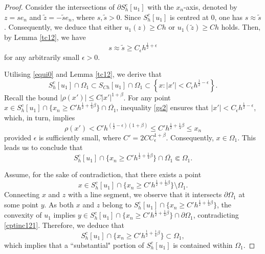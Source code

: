 \documentclass[11pt]{amsart}
\theoremstyle{plain}
\newcommand{\0}{\textbf{0}}
\numberwithin{equation}{section}
\numberwithin{equation}{section}
\numberwithin{figure}{section}
\begin{document}
\begin{proof}
Consider the intersections of $\partial S_h^c[u_1]$ with the $x_n$-axis, denoted by $z = se_n$ and $\tilde{z} = -\tilde{s}e_n$, where $s, \tilde{s} > 0$. Since $S_h^c[u_1]$ is centred at $0$, one has $s\approx \tilde{s}$. Consequently, we deduce that either $u_1(z) \geq Ch$ or $u_1(\tilde{z}) \geq Ch$ holds. 
Then, by Lemma \ref{tc12}, we have
\begin{equation}\label{gs1}
s \approx \tilde{s} \geq C_\epsilon h^{\frac{1}{2} + \epsilon}
\end{equation}
for any arbitrarily small $\epsilon > 0$.

Utilising \eqref{equi0} and Lemma \ref{tc12}, we derive that
\begin{equation}\label{gs2}
S^c_h[u_1] \cap \Omega_1 \subset S_{Ch}[u_1] \cap \Omega_1 \subset \left\{x : |x'| < C_\epsilon h^{\frac{1}{2} - \epsilon} \right\}.
\end{equation}
Recall the bound $|\rho(x')| \leq C|x'|^{1+\beta}$. For any point $x\in S_h^c[u_1] \cap \{x_n \geq C'h^{\frac{1}{2} + \frac{1}{4}\beta}\} \cap \overline{\Omega_1}$, inequality \eqref{gs2} ensures that $|x'| < C_\epsilon h^{\frac{1}{2} - \epsilon}$, which, in turn, implies 
	$$\rho(x') < C' h^{(\frac{1}{2} - \epsilon)(1 + \beta)} \leq C'h^{\frac{1}{2} + \frac{1}{4}\beta} \leq x_n$$ 
provided $\epsilon$ is sufficiently small, where $C' = 2CC_\epsilon^{1 + \beta}$. 
Consequently, $x\in \Omega_1$. This leads us to conclude that
\begin{equation}\label{cptinc121}
S_h^c[u_1] \cap \{x_n \geq C'h^{\frac{1}{2} + \frac{1}{4}\beta}\} \cap \overline{\Omega_1} \Subset \Omega_1.
\end{equation}

Assume, for the sake of contradiction, that there exists a point 
	$$x \in S_h^c[u_1] \cap \{x_n \geq C'h^{\frac{1}{2} + \frac{1}{4}\beta}\} \setminus \Omega_1.$$
Connecting $x$ and $z$ with a line segment, we observe that it intersects $\partial \Omega_1$ at some point $y$. As both $x$ and $z$ belong to $S_h^c[u_1] \cap \{x_n \geq C'h^{\frac{1}{2} + \frac{1}{4}\beta}\}$, the convexity of $u_1$ implies $y \in S_h^c[u_1] \cap \{x_n \geq C'h^{\frac{1}{2} + \frac{1}{4}\beta}\} \cap \partial \Omega_1$, contradicting \eqref{cptinc121}. Therefore, we deduce that
\begin{equation}\label{gs3}
S_h^c[u_1] \cap \{x_n \geq C'h^{\frac{1}{2} + \frac{1}{4}\beta}\} \subset \Omega_1,
\end{equation}
which implies that a ``substantial" portion of $S^c_h[u_1]$ is contained within $\Omega_1$.


\end{proof}
\end{document}
